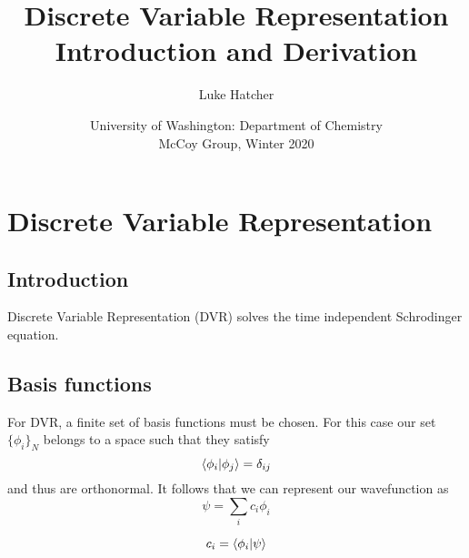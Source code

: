 \documentclass[12pt]{article}
\begin{document}
\title{Discrete Variable Representation Introduction and Derivation}
\author{Luke Hatcher}
\date{University of Washington: Department of Chemistry \\ McCoy Group, Winter 2020}
\maketitle


\section{Discrete Variable Representation}
\subsection{Introduction}
Discrete Variable Representation (DVR) solves the time independent Schrodinger equation.  
\subsection{Basis functions}
For DVR, a finite set of basis functions must be chosen. 
For this case our set $\{\phi_i\}_N$ belongs to a space such that they satisfy
\begin{equation}
\braket{\phi_i|\phi_j} = \delta_{ij}
\end{equation}
and thus are orthonormal.  
It follows that we can represent our wavefunction as
\begin{equation}
\psi=\sum_i{c_i}\phi_i
\end{equation}

\begin{equation}
c_i = \braket{\phi_i|\psi}
\end{equation}
\end{document}
